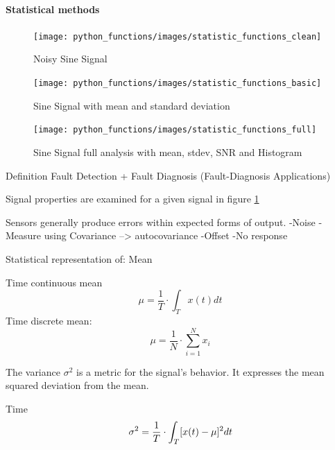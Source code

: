 \paragraph{Statistical methods}




\cite{smith_scientist_1999}
\begin{figure}[h]
    \centering
    \texttt{[image: python\_functions/images/statistic\_functions\_clean]}
    \caption{Noisy Sine Signal}
    \label{fig:statistics_clean}
\end{figure}
\begin{figure}[h]
    \centering
    \texttt{[image: python\_functions/images/statistic\_functions\_basic]}
    \caption{Sine Signal with mean and standard deviation}
    \label{fig:statistics_basic}
\end{figure}
\begin{figure}[h]
    \centering
    \texttt{[image: python\_functions/images/statistic\_functions\_full]}
    \caption{Sine Signal full analysis with mean, stdev, SNR and Histogram}
    \label{fig:statistics_full}
\end{figure}


Definition Fault Detection + Fault Diagnosis (Fault-Diagnosis Applications)


Signal properties are examined for a given signal in figure \ref{fig:statistics_clean}



Sensors generally produce errors within expected forms of output. -Noise -Measure using Covariance --> autocovariance -Offset -No response

Statistical representation of: Mean

\cite[S.13-17]{smith_scientist_1999}

Time continuous mean
\begin{equation}
    \label{eq:mean_cont}
    \mu=\frac{1}{T} \cdot \int_T x(t) d t
\end{equation}
Time discrete mean:
\begin{equation}
    \label{eq:mean_disc}
    \mu=\frac{1}{N} \cdot \sum_{i=1}^{N} x_i
\end{equation}




The variance $\sigma^2$ is a metric for the signal's behavior. It expresses the mean squared deviation from the mean.

Time
\begin{equation}
    \label{eq:var_cont}
    \sigma^2=\frac{1}{T} \cdot \int_T[x(t)-\mu]^2 d t\\
\end{equation}

